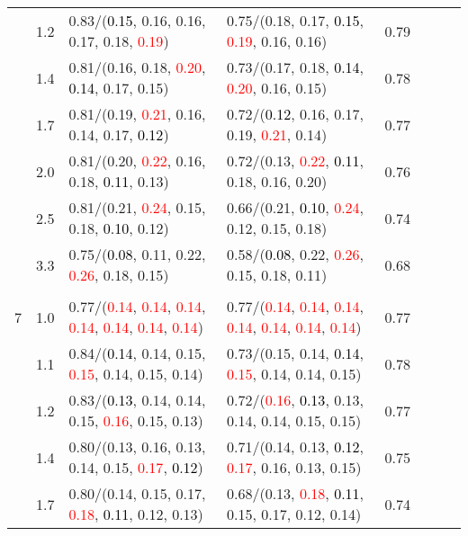 \documentclass[10pt,a4paper]{report}
\begin{document}
\begin{table}[!htbp]
\begin{center}
{\begin{tabular}{ccllcccc}
			&1.2&0.83/(\textcolor{black}{0.15}, 0.16, 0.16, 0.17, 0.18, \textcolor{red}{0.19})&0.75/(0.18, 0.17, \textcolor{black}{0.15}, \textcolor{red}{0.19}, 0.16, 0.16)&0.79\\
			&1.4&0.81/(0.16, 0.18, \textcolor{red}{0.20}, \textcolor{black}{0.14}, 0.17, 0.15)&0.73/(0.17, 0.18, \textcolor{black}{0.14}, \textcolor{red}{0.20}, 0.16, 0.15)&0.78\\
			&1.7&0.81/(0.19, \textcolor{red}{0.21}, 0.16, 0.14, 0.17, \textcolor{black}{0.12})&0.72/(\textcolor{black}{0.12}, 0.16, 0.17, 0.19, \textcolor{red}{0.21}, 0.14)&0.77\\
			&2.0&0.81/(0.20, \textcolor{red}{0.22}, 0.16, 0.18, \textcolor{black}{0.11}, 0.13)&0.72/(0.13, \textcolor{red}{0.22}, \textcolor{black}{0.11}, 0.18, 0.16, 0.20)&0.76\\
			&2.5&0.81/(0.21, \textcolor{red}{0.24}, 0.15, 0.18, \textcolor{black}{0.10}, 0.12)&0.66/(0.21, \textcolor{black}{0.10}, \textcolor{red}{0.24}, 0.12, 0.15, 0.18)&0.74\\
			&3.3&0.75/(\textcolor{black}{0.08}, 0.11, 0.22, \textcolor{red}{0.26}, 0.18, 0.15)&0.58/(\textcolor{black}{0.08}, 0.22, \textcolor{red}{0.26}, 0.15, 0.18, 0.11)&0.68\\
			&&&&\\
			7			&1.0&0.77/(\textcolor{red}{0.14}, \textcolor{red}{0.14}, \textcolor{red}{0.14}, \textcolor{red}{0.14}, \textcolor{red}{0.14}, \textcolor{red}{0.14}, \textcolor{red}{0.14})&0.77/(\textcolor{red}{0.14}, \textcolor{red}{0.14}, \textcolor{red}{0.14}, \textcolor{red}{0.14}, \textcolor{red}{0.14}, \textcolor{red}{0.14}, \textcolor{red}{0.14})&0.77\\
			&1.1&0.84/(\textcolor{black}{0.14}, 0.14, 0.15, \textcolor{red}{0.15}, 0.14, 0.15, 0.14)&0.73/(0.15, 0.14, \textcolor{black}{0.14}, \textcolor{red}{0.15}, 0.14, 0.14, 0.15)&0.78\\
			&1.2&0.83/(\textcolor{black}{0.13}, 0.14, 0.14, 0.15, \textcolor{red}{0.16}, 0.15, 0.13)&0.72/(\textcolor{red}{0.16}, \textcolor{black}{0.13}, 0.13, 0.14, 0.14, 0.15, 0.15)&0.77\\
			&1.4&0.80/(0.13, 0.16, 0.13, 0.14, 0.15, \textcolor{red}{0.17}, \textcolor{black}{0.12})&0.71/(0.14, 0.13, \textcolor{black}{0.12}, \textcolor{red}{0.17}, 0.16, 0.13, 0.15)&0.75\\
			&1.7&0.80/(0.14, 0.15, 0.17, \textcolor{red}{0.18}, \textcolor{black}{0.11}, 0.12, 0.13)&0.68/(0.13, \textcolor{red}{0.18}, \textcolor{black}{0.11}, 0.15, 0.17, 0.12, 0.14)&0.74\\

\end{tabular}}
\end{center}
\end{table}
\end{document}
